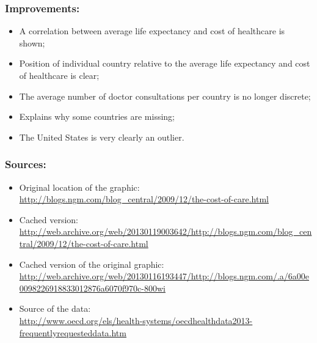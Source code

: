 \documentclass{beamer}
\begin{document}
{
    \begin{frame}[plain] \end{frame}
}

\begin{frame}
    \frametitle{Improvements:}
    \begin{itemize}
        \item A correlation between average life expectancy and cost of healthcare is shown;
        \item Position of individual country relative to the average life expectancy and cost of healthcare is clear;
        \item The average number of doctor consultations per country is no longer discrete;
        \item Explains why some countries are missing;
        \item The United States is very clearly an outlier.
    \end{itemize}
\end{frame}

\begin{frame}
    \frametitle{Sources:}
    \begin{itemize}
        \item Original location of the graphic:\\{\tiny\url{http://blogs.ngm.com/blog_central/2009/12/the-cost-of-care.html}}
        \item Cached version:\\{\tiny\url{http://web.archive.org/web/20130119003642/http://blogs.ngm.com/blog_central/2009/12/the-cost-of-care.html}}
        \item Cached version of the original graphic:\\{\tiny\url{http://web.archive.org/web/20130116193447/http://blogs.ngm.com/.a/6a00e0098226918833012876a6070f970c-800wi}}
        \item Source of the data:\\{\tiny\url{http://www.oecd.org/els/health-systems/oecdhealthdata2013-frequentlyrequesteddata.htm}}
    \end{itemize}
\end{frame}
\end{document}
